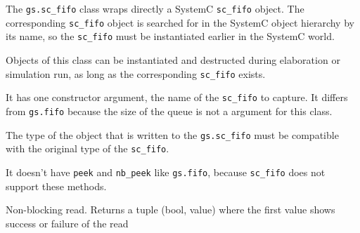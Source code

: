 \documentclass[12pt,oneside]{gsbook}
\begin{document}
 {The \texttt{gs.sc\_fifo} class wraps directly a
SystemC \texttt{sc\_fifo} object. The corresponding \texttt{sc\_fifo}
object is searched for in the SystemC object hierarchy by its name, so
the \texttt{sc\_fifo} must be instantiated earlier in
the SystemC world.

Objects of this class can be instantiated and destructed during elaboration or
simulation run, as long as the corresponding \texttt{sc\_fifo} exists.

It has one constructor argument, the name of the \texttt{sc\_fifo} to
capture. It differs from \texttt{gs.fifo} because the size of the
queue is not a argument for this class.

The type of the object that is written to the \texttt{gs.sc\_fifo}
must be compatible with the original type of the \texttt{sc\_fifo}.

It doesn't have \texttt{peek} and \texttt{nb\_peek} like
\texttt{gs.fifo}, because \texttt{sc\_fifo} does not support these
methods.}

\begin{methods}


 {Non-blocking read. Returns a tuple (bool, value)
where the first value shows success or failure of the read}







\end{methods}
\end{document}
